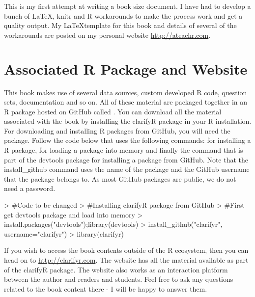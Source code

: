 This is my first attempt at writing a book size document. I have had to develop a bunch of \LaTeX, knitr and R workarounds to make the process work and get a quality output. My \LaTeX  template for this book and details of several of the workarounds are posted on my personal website \url{http://ateachr.com}. 

\section*{Associated R Package and Website}

This book makes use of several data sources, custom developed R code, question sets, documentation and so on. All of these material are packaged together in an R package hosted on GitHub called . You can download all the material associated with the book by installing the clarifyR package in your R installation. For downloading and installing R packages from GitHub, you will need the  package. Follow the code below that uses the following commands:  for installing a R package,  for loading a package into memory and finally the  command that is part of the devtools package for installing a package from GitHub. Note that the install\_github command uses the name of the package and the GitHub username that the package belongs to. As most GitHub packages are public, we do not need a password.


\begin{Schunk}
\begin{Sinput}
> #Code to be changed 
> #Installing clarifyR package from GitHub
> #First get devtools package and load into memory
> install.packages("devtools");library(devtools)
> install_github("clarifyr", username="clarifyr")
> library(clarifyr)
\end{Sinput}
\end{Schunk}

If you wish to access the book contents outside of the R ecosystem, then you can head on to \url{http://clarifyr.com}. The website has all the material available as part of the clarifyR package. The website also works as an interaction platform between the author and readers and students. Feel free to ask any questions related to the book content there - I will be happy to answer them. 

